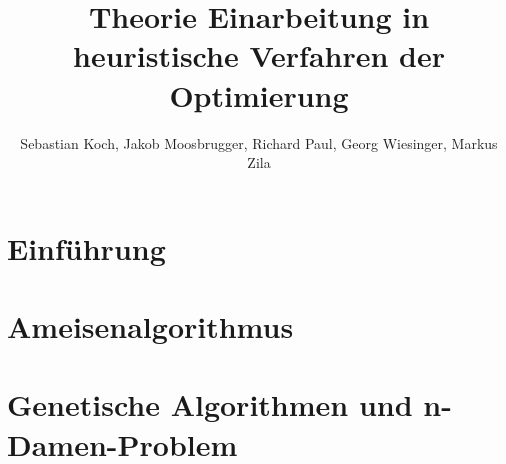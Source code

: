 \documentclass{llncs}
\begin{document}
	
	\title{Theorie Einarbeitung in heuristische Verfahren der Optimierung}
	\author{	Sebastian Koch, Jakob Moosbrugger, Richard Paul, Georg Wiesinger, Markus Zila}
	
	\maketitle
	
	\section{Einführung}
	
	\section{Ameisenalgorithmus}
	
	\section{Genetische Algorithmen und n-Damen-Problem}
	
\end{document}

